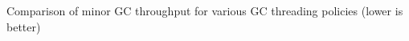 \label{fig:staticopt:compare:gc}Comparison of minor GC throughput for various GC threading policies (lower is better)